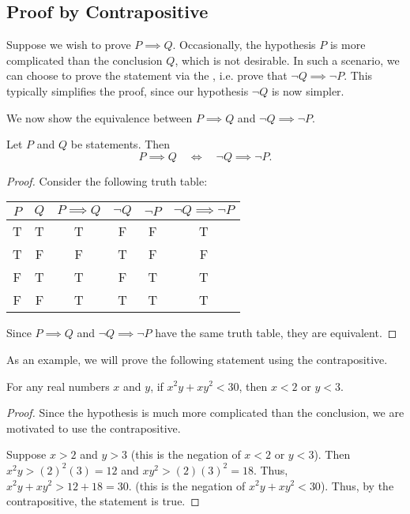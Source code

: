 \subsection{Proof by Contrapositive}

Suppose we wish to prove $P \implies Q$. Occasionally, the hypothesis $P$ is more complicated than the conclusion $Q$, which is not desirable. In such a scenario, we can choose to prove the statement via the , i.e. prove that $\lnot Q \implies \lnot P$. This typically simplifies the proof, since our hypothesis $\lnot Q$ is now simpler.

We now show the equivalence between $P \implies Q$ and $\lnot Q \implies \lnot P$.

\begin{proposition}
    Let $P$ and $Q$ be statements. Then \[P \implies Q \quad \iff \quad \lnot Q \implies \lnot P.\]
\end{proposition}
\begin{proof}
    Consider the following truth table:

    \begin{table}[H]
        \centering
        \begin{tabular}{|c|c|c|c|c|c|}
        \hline
        $P$ & $Q$ & $P \implies Q$ & $\lnot Q$ & $\lnot P$ & $\lnot Q \implies \lnot P$ \\ \hline
        T & T & T & F & F & T \\ \hline
        T & F & F & T & F & F \\ \hline
        F & T & T & F & T & T \\ \hline
        F & F & T & T & T & T \\ \hline
        \end{tabular}
    \end{table}

    Since $P \implies Q$ and $\lnot Q \implies \lnot P$ have the same truth table, they are equivalent.
\end{proof}

As an example, we will prove the following statement using the contrapositive.

\begin{statement}
    For any real numbers $x$ and $y$, if $x^2 y + x y^2 < 30$, then $x < 2$ or $y < 3$.
\end{statement}
\begin{proof}
    Since the hypothesis is much more complicated than the conclusion, we are motivated to use the contrapositive.

    Suppose $x > 2$ and $y > 3$ (this is the negation of $x < 2$ or $y < 3$). Then $x^2 y > (2)^2 (3) = 12$ and $xy^2 > (2)(3)^2 = 18$. Thus, $x^2 y + xy^2 > 12 + 18 = 30$. (this is the negation of $x^2y + xy^2 < 30$). Thus, by the contrapositive, the statement is true.
\end{proof}

